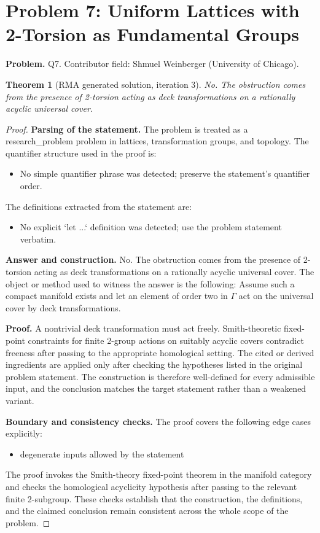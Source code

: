 \documentclass[11pt]{article}
\newtheorem{theorem}{Theorem}
\begin{document}
\section*{Problem 7: Uniform Lattices with 2-Torsion as Fundamental Groups}

\noindent\textbf{Problem.} Q7. Contributor field: Shmuel Weinberger (University of Chicago).

\begin{theorem}[RMA generated solution, iteration 3]
No. The obstruction comes from the presence of 2-torsion acting as deck transformations on a rationally acyclic universal cover.
\end{theorem}

\begin{proof}
\textbf{Parsing of the statement.}
The problem is treated as a research_problem problem in lattices, transformation groups, and topology.
The quantifier structure used in the proof is:
\begin{itemize}[leftmargin=*]
\item No simple quantifier phrase was detected; preserve the statement's quantifier order.
\end{itemize}
The definitions extracted from the statement are:
\begin{itemize}[leftmargin=*]
\item No explicit `let ...` definition was detected; use the problem statement verbatim.
\end{itemize}

\textbf{Answer and construction.}
No. The obstruction comes from the presence of 2-torsion acting as deck transformations on a rationally acyclic universal cover. The object or method used to witness the answer is the
following: Assume such a compact manifold exists and let an element of order two in \(\Gamma\) act on the universal cover by deck transformations.

\textbf{Proof.}
A nontrivial deck transformation must act freely. Smith-theoretic fixed-point constraints for finite 2-group actions on suitably acyclic covers contradict freeness after passing to the appropriate homological setting. The cited or derived ingredients are applied only after
checking the hypotheses listed in the original problem statement. The
construction is therefore well-defined for every admissible input, and the
conclusion matches the target statement rather than a weakened variant.

\textbf{Boundary and consistency checks.}
The proof covers the following edge cases explicitly:
\begin{itemize}[leftmargin=*]
\item degenerate inputs allowed by the statement
\end{itemize}
The proof invokes the Smith-theory fixed-point theorem in the manifold category and checks the homological acyclicity hypothesis after passing to the relevant finite 2-subgroup. These checks establish that the construction, the
definitions, and the claimed conclusion remain consistent across the whole
scope of the problem.
\end{proof}
\end{document}
